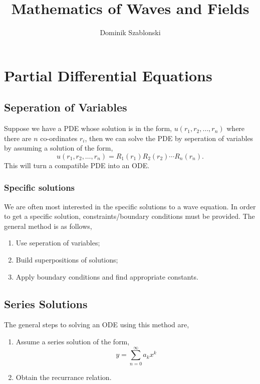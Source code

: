 \documentclass{book}
\title{Mathematics of Waves and Fields}
\author{Dominik Szablonski}
\begin{document}
\maketitle

\tableofcontents

\chapter{Partial Differential Equations}
\section{Seperation of Variables}
Suppose we have a PDE whose solution is in the form, $u(r_1,r_2,\ldots,r_n)$ where there are $n$ co-ordinates $r_i$, then we can solve the PDE by seperation of variables by assuming a solution of the form,
\begin{equation}
	u(r_1,r_2,\ldots,r_n) = R_1(r_1)R_2(r_2)\cdots R_n(r_n).
\end{equation}
This will turn a compatible PDE into an ODE.
\subsection{Specific solutions}
We are often most interested in the specific solutions to a wave equation. In order to get a specific solution, constraints/boundary conditions must be provided. The general method is as follows,
\begin{enumerate}
	\item Use seperation of variables;
	\item Build superpositions of solutions;
	\item Apply boundary conditions and find appropriate constants.
\end{enumerate}
\section{Series Solutions}
The general steps to solving an ODE using this method are,
\begin{enumerate}
	\item Assume a series solution of the form,
	\begin{equation}
		y = \sum_{n=0}^{\infty}a_kx^k
	\end{equation}
	\item Obtain the recurrance relation.
\end{enumerate}
\end{document}
